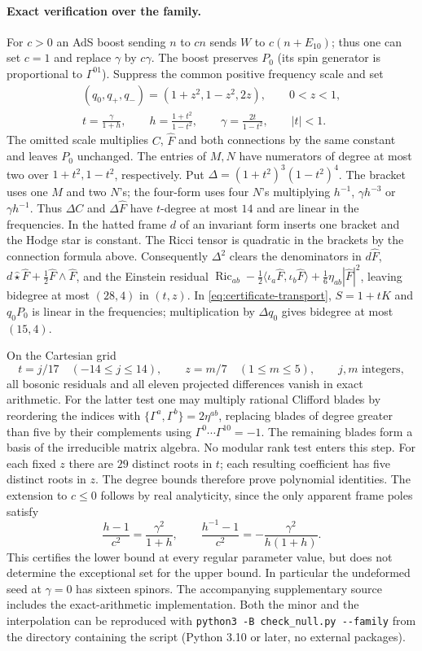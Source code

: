 \paragraph{Exact verification over the family.}
For $c>0$ an AdS boost sending $n$ to $cn$ sends $W$ to $c(n+E_{10})$;
thus one can set $c=1$ and replace $\gamma$ by $c\gamma$. The boost
preserves $P_0$ (its spin generator is proportional to $\Gamma^{01}$).
Suppress the common positive frequency scale and set
\[
 \begin{gathered}
 (q_0,q_+,q_-)=(1+z^2,1-z^2,2z),\qquad 0<z<1,\\
 t=\frac{\gamma}{1+h},\qquad h=\frac{1+t^2}{1-t^2},\qquad
 \gamma=\frac{2t}{1-t^2},\qquad |t|<1 .
 \end{gathered}
\]
The omitted scale multiplies $C$, $\hat F$ and both connections by the
same constant and leaves $P_0$ unchanged. The entries of $M,N$ have
numerators of degree at most two over $1+t^2,1-t^2$, respectively. Put
$\Delta=(1+t^2)^3(1-t^2)^4$. The bracket uses one $M$ and two $N$'s;
the four-form uses four $N$'s multiplying $h^{-1}$, $\gamma h^{-3}$ or
$\gamma h^{-1}$. Thus $\Delta C$ and $\Delta\hat F$ have $t$-degree at
most $14$ and are linear in the frequencies. In the hatted frame $d$ of
an invariant form inserts one bracket and the Hodge star is constant.
The Ricci tensor is quadratic in the brackets by the connection formula
above. Consequently $\Delta^2$ clears the denominators in $d\hat F$,
$d\hat\star\hat F+\tfrac12\hat F\wedge\hat F$, and the Einstein residual
$\operatorname{Ric}_{ab}-\tfrac12\langle\iota_a\hat F,\iota_b\hat F\rangle
+\tfrac16\eta_{ab}|\hat F|^2$, leaving bidegree at most $(28,4)$ in
$(t,z)$. In \eqref{eq:certificate-transport}, $S=1+tK$ and $q_0P_0$ is
linear in the frequencies; multiplication by $\Delta q_0$ gives bidegree
at most $(15,4)$.

On the Cartesian grid
\[
 t=j/17\quad(-14\le j\le14),\qquad z=m/7\quad(1\le m\le5),
 \qquad j,m\text{ integers},
\]
all bosonic residuals and all eleven projected differences vanish in
exact arithmetic. For the latter test one may multiply rational Clifford
blades by reordering the indices with $\{\Gamma^a,\Gamma^b\}=2\eta^{ab}$,
replacing blades of degree greater than five by their complements using
$\Gamma^0\cdots\Gamma^{10}=-1$. The remaining blades form a basis of the
irreducible matrix algebra. No modular rank test enters this step.
For each fixed $z$ there are $29$ distinct roots in $t$; each resulting
coefficient has five distinct roots in $z$. The degree bounds therefore
prove polynomial identities. The extension to $c\le0$ follows by real
analyticity, since the only apparent frame poles satisfy
\[
 \frac{h-1}{c^2}=\frac{\gamma^2}{1+h},\qquad
 \frac{h^{-1}-1}{c^2}=-\frac{\gamma^2}{h(1+h)} .
\]
This certifies the lower bound at every regular parameter value, but does
not determine the exceptional set for the upper bound. In particular the
undeformed seed at $\gamma=0$ has sixteen spinors. The accompanying supplementary source includes the exact-arithmetic implementation. Both the minor and the interpolation can be reproduced with
\verb|python3 -B check_null.py --family| from the directory containing
the script (Python 3.10 or later, no external packages).
